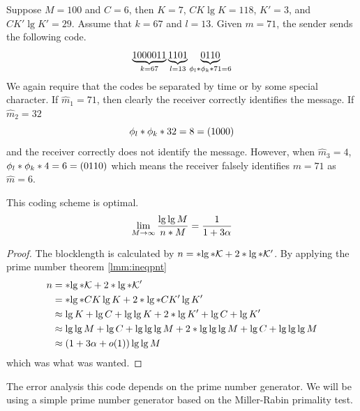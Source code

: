 \documentclass{article}
\begin{document}
\begin{example}
	Suppose \(M = 100\) and \(C = 6\), then \(K = 7\), \(C K \lg K  = 118\), \(K' = 3\), and \(C K' \lg K' = 29\). Assume that  \(k = 67\) and \(l = 13\). Given \(m = 71\), the sender sends the following code. 
	\begin{equation*}
		\underbrace{1000011}_{k = 67} \underbrace{1101}_{l = 13} \underbrace{0110}_{\func{\phi_l}{\func{\phi_k}{71}} = 6}
	\end{equation*}
	We again require that the codes be separated by time or by some special character. 
	If \(\hat{m}_1 = 71\), then clearly the receiver correctly identifies the message. If \(\hat{m}_2 = 32\) 
	\begin{equation*}
		\func{\phi_l}{\func{\phi_k}{32}} = 8 = (1000)
	\end{equation*}
	and the receiver correctly does not identify the message. However, when \(\hat{m}_3 = 4\), \(\func{\phi_l}{\func{\phi_k}{4}} = 6 = (0110)\) which means the receiver falsely identifies \(m = 71\) as \(\hat{m} = 6\).
\end{example}
\begin{theorem}
	This coding scheme is optimal.
	\begin{equation}
		\lim_{M \to \infty} \dfrac{\lg \lg M}{\func{n}{M}} = \dfrac{1}{1+3\alpha}
	\end{equation}
\end{theorem}

\begin{proof}
	The blocklength is calculated by \(n = \ceil{\lg \abs{\mathcal{K}}} + 2\ceil{\lg \abs{\mathcal{K}'}}\). By applying the prime number theorem \ref{lmm:ineqpnt}
	\begin{align}
		n &= \ceil{\lg \abs{\mathcal{K}}} + 2\ceil{\lg \abs{\mathcal{K}'}}\\
		&= \ceil{\lg \ceil{CK\lg K}} + 2\ceil{\lg \ceil{CK'\lg K'}} \\
		&\approx \lg K + \lg C + \lg \lg K + 2 \bracket{\lg K' + \lg C + \lg K'}\\
		&\approx \lg \lg M + \lg C + \lg \lg \lg M + 2 \bracket{\lg \lg\lg M + \lg C + \lg \lg \lg M}\\
		&\approx (1 + 3\alpha + o(1)) \lg\lg M
	\end{align}
	which was what was wanted.
\end{proof}
The error analysis this code depends on the prime number generator. We will be using a simple prime number generator based on the Miller-Rabin primality test.
\end{document}
